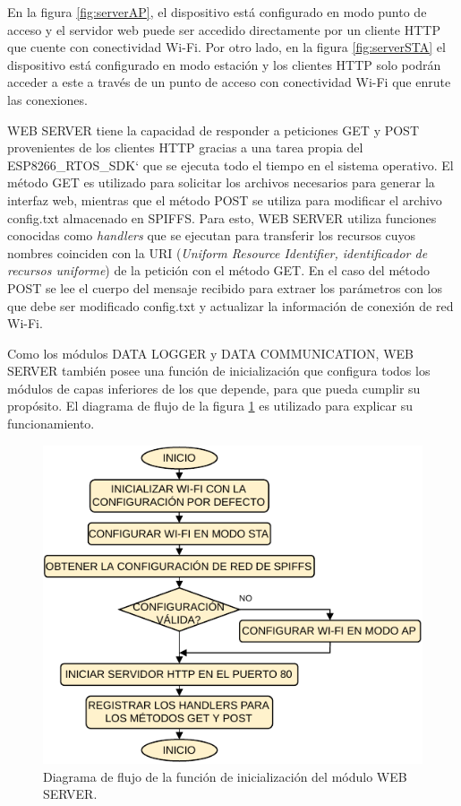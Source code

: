 En la figura \ref{fig:serverAP}, el dispositivo está configurado en modo punto de acceso y el servidor web puede ser accedido directamente por un cliente HTTP que cuente con conectividad Wi-Fi. Por otro lado, en la figura \ref{fig:serverSTA} el dispositivo está configurado en modo estación y los clientes HTTP solo podrán acceder a este a través de un punto de acceso con conectividad Wi-Fi que enrute las conexiones.

WEB SERVER tiene la capacidad de responder a peticiones GET y POST provenientes de los clientes HTTP gracias a una tarea propia del ESP8266\_RTOS\_SDK` que se ejecuta todo el tiempo en el sistema operativo. El método GET es utilizado para solicitar los archivos necesarios para generar la interfaz web, mientras que el método POST se utiliza para modificar el archivo config.txt almacenado en SPIFFS. Para esto, WEB SERVER utiliza funciones conocidas como \textit{handlers} que se ejecutan para transferir los recursos cuyos nombres coinciden con la URI (\textit{Uniform Resource Identifier, identificador de recursos uniforme}) de la petición con el método GET. En el caso del método POST se lee el cuerpo del mensaje recibido para extraer los parámetros con los que debe ser modificado config.txt y actualizar la información de conexión de red Wi-Fi.

Como los módulos DATA LOGGER y DATA COMMUNICATION, WEB SERVER también posee una función de inicialización que configura todos los módulos de capas inferiores de los que depende, para que pueda cumplir su propósito. El diagrama de flujo de la figura \ref{fig:serverInit} es utilizado para explicar su funcionamiento.

\begin{figure}[h]
	\centering
	\includegraphics[scale=1]{./Figures/web_server_init.pdf}
	\caption{Diagrama de flujo de la función de inicialización del módulo WEB SERVER.}
		\label{fig:serverInit}
\end{figure}

